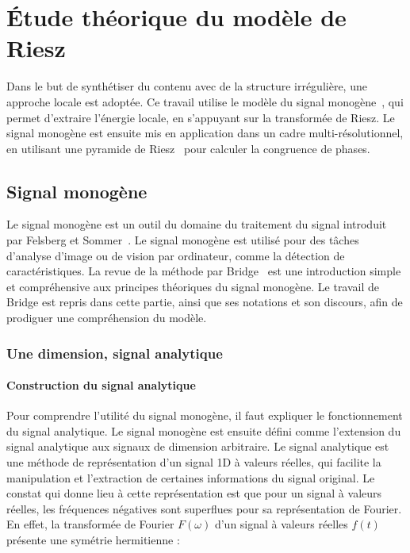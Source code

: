 \chapter[Modèle de Riesz]{Étude théorique du modèle de Riesz} %
\label{chap:chapitre1}

Dans le but de synthétiser du contenu avec de la structure irrégulière, une approche locale est adoptée. Ce travail utilise le modèle du signal monogène~\cite{felsberg_monogenic_2001}, qui permet d'extraire l'énergie locale, en s'appuyant sur la transformée de Riesz. Le signal monogène est ensuite mis en application dans un cadre multi-résolutionnel, en utilisant une pyramide de Riesz~\cite{wadhwa_riesz_2014} pour calculer la congruence de phases.

\section{Signal monogène}

Le signal monogène est un outil du domaine du traitement du signal introduit par Felsberg et Sommer~\cite{felsberg_monogenic_2001}. Le signal monogène est utilisé pour des tâches d'analyse d'image ou de vision par ordinateur, comme la détection de caractéristiques. La revue de la méthode par Bridge~\cite{bridge_introduction_2018} est une introduction simple et compréhensive aux principes théoriques du signal monogène. Le travail de Bridge est repris dans cette partie, ainsi que ses notations et son discours, afin de prodiguer une compréhension du modèle.

\subsection{Une dimension, signal analytique}

\subsubsection{Construction du signal analytique}

Pour comprendre l'utilité du signal monogène, il faut expliquer le fonctionnement du signal analytique. Le signal monogène est ensuite défini comme l'extension du signal analytique aux signaux de dimension arbitraire. Le signal analytique est une méthode de représentation d'un signal 1D à valeurs réelles, qui facilite la manipulation et l'extraction de certaines informations du signal original. Le constat qui donne lieu à cette représentation est que pour un signal à valeurs réelles, les fréquences négatives sont superflues pour sa représentation de Fourier. En effet, la transformée de Fourier $F(\omega)$ d'un signal à valeurs réelles $f(t)$ présente une symétrie hermitienne :

